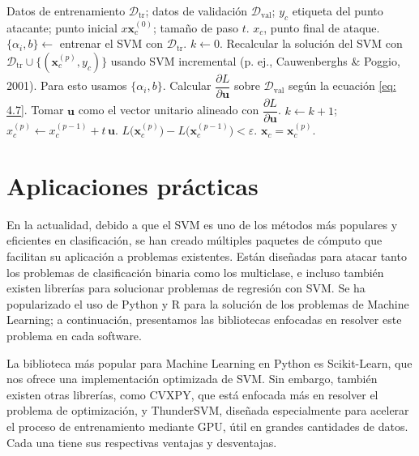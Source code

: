 \documentclass[letterpaper,12pt,oneside]{book}
\begin{document}
{{{{\begin{algorithm}
\caption{Ataque de envenenamiento contra SVM}
\begin{algorithmic}[1]
\REQUIRE Datos de entrenamiento $\mathcal{D}_{\text{tr}}$; datos de validación $\mathcal{D}_{\text{val}}$; $y_c$ etiqueta del punto atacante; punto inicial $x \mathbf{x}_c^{(0)}$; tamaño de paso $t$.
\ENSURE $x_c$, punto final de ataque.
\STATE $\{\alpha_i, b\} \leftarrow$ entrenar el SVM con $\mathcal{D}_{\text{tr}}$.
\STATE $k \leftarrow 0$.
\REPEAT
    \STATE Recalcular la solución del SVM con $\mathcal{D}_{\text{tr}} \cup \{( \mathbf{x}_c^{(p)}, y_c)\}$ usando SVM incremental (p. ej., Cauwenberghs \& Poggio, 2001). Para esto usamos $\{\alpha_i, b\}$.
    \STATE Calcular $\dfrac{\partial L}{\partial \mathbf{u}}$ sobre $\mathcal{D}_{\text{val}}$ según la ecuación \eqref{eq: 4.7}.
    \STATE Tomar $\mathbf{u}$ como el vector unitario alineado con $\dfrac{\partial L}{\partial \mathbf{u}}$.
    \STATE $k \leftarrow k + 1$; $x_c^{(p)} \leftarrow x_c^{(p-1)} + t\,\mathbf{u}$.
\UNTIL $L\big( \mathbf{x}_c^{(p)}\big) - L\big( \mathbf{x}_c^{(p-1)}\big) < \varepsilon$.
\RETURN $ \mathbf{x}_c =  \mathbf{x}_c^{(p)}$.
\end{algorithmic}
\end{algorithm}









\chapter{Aplicaciones prácticas}
En la actualidad, debido a que el SVM es uno de los métodos más populares y eficientes en clasificación, se han creado múltiples paquetes de cómputo que facilitan su aplicación a problemas existentes. Están diseñadas para atacar tanto los problemas de clasificación binaria como los multiclase, e incluso también existen librerías para solucionar problemas de regresión con SVM. Se ha popularizado el uso de Python y R para la solución de los problemas de Machine Learning; a continuación, presentamos las bibliotecas enfocadas en resolver este problema en cada software.

La biblioteca más popular para Machine Learning en Python es Scikit-Learn, que nos ofrece una implementación optimizada de SVM. Sin embargo, también existen otras librerías, como CVXPY, que está enfocada más en resolver el problema de optimización, y ThunderSVM, diseñada especialmente para acelerar el proceso de entrenamiento mediante GPU, útil en grandes cantidades de datos. Cada una tiene sus respectivas ventajas y desventajas.

}}}}
\end{document}
